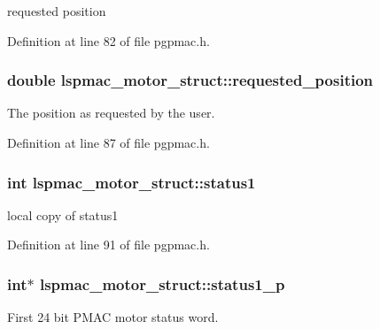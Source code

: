 requested position 



Definition at line 82 of file pgpmac.\-h.

\hypertarget{structlspmac__motor__struct_af8cdc94c6e2478b12ce942d4cf1d7499}{
\subsubsection[{requested\-\_\-position}]{\setlength{\rightskip}{0pt plus 5cm}double lspmac\-\_\-motor\-\_\-struct\-::requested\-\_\-position}}\label{structlspmac__motor__struct_af8cdc94c6e2478b12ce942d4cf1d7499}


The position as requested by the user. 



Definition at line 87 of file pgpmac.\-h.

\hypertarget{structlspmac__motor__struct_acb52b612b9237e8eec0b97fb1e76a35d}{
\subsubsection[{status1}]{\setlength{\rightskip}{0pt plus 5cm}int lspmac\-\_\-motor\-\_\-struct\-::status1}}\label{structlspmac__motor__struct_acb52b612b9237e8eec0b97fb1e76a35d}


local copy of status1 



Definition at line 91 of file pgpmac.\-h.

\hypertarget{structlspmac__motor__struct_a56c41875faf19c643e97c10519e6eb8c}{
\subsubsection[{status1\-\_\-p}]{\setlength{\rightskip}{0pt plus 5cm}int$\ast$ lspmac\-\_\-motor\-\_\-struct\-::status1\-\_\-p}}\label{structlspmac__motor__struct_a56c41875faf19c643e97c10519e6eb8c}


First 24 bit P\-M\-A\-C motor status word. 



